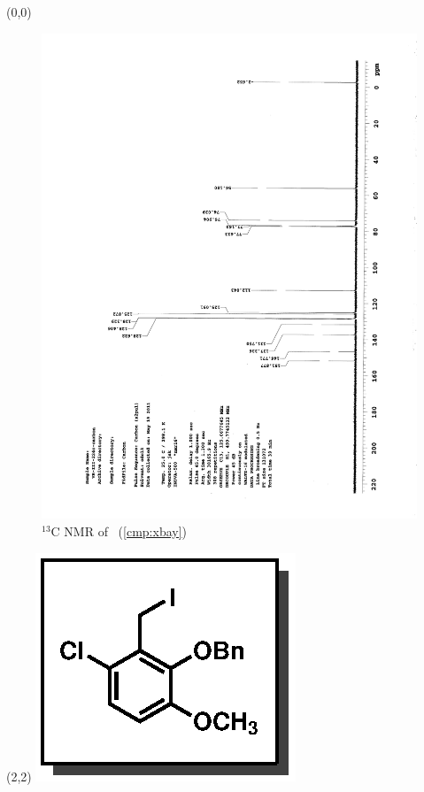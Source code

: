 \clearpage
\begin{textblock}{20}(0,0)
\begin{figure}[htb]
\caption{$^{13}$C NMR of  \CMPxbay\ (\ref{cmp:xbay})}
\includegraphics[scale=0.75, trim = 0mm 0mm 0mm 5mm,
clip]{chp_singlecarbon/images/nmr/xbayC}
\vspace{-100pt}
\end{figure}
\end{textblock}
\begin{textblock}{1}(2,2)
\includegraphics[scale=0.8, angle=90]{chp_singlecarbon/images/xbay}
\end{textblock}
\clearpage

